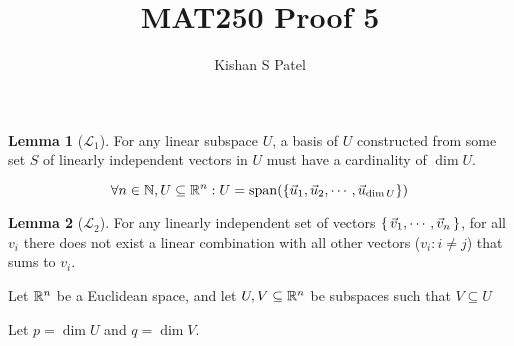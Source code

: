 \documentclass{exam}
\theoremstyle{plain}
\theoremstyle{definition}
\newtheorem{lemma}{Lemma}
\begin{document}
\title{MAT250 Proof 5}
\author{Kishan S Patel}
\maketitle

\renewcommand{\qedsymbol}{QED}

\begin{lemma}[$\mathcal L_1$]
	For any linear subspace $U$, a basis of $U$ constructed from some set $S$ of linearly independent vectors in $U$ must have a cardinality of $\dim U$.

	$$ \forall n\in {\mathbb N},U \subseteq {\mathbb R}^n  : U = {\operatorname{span} }{ \left(  \left\{  \vec u_1, \vec u_2, \cdots, \vec u_{\dim U}  \right\} \right) } $$
\end{lemma}

\begin{lemma}[$\mathcal L_2$]
	For any linearly independent set of vectors $\set{\vec v_1, \cdots, \vec v_n}$, for all $v_i$ there does not exist a linear combination with all other vectors ($v_i : i \neq j$) that sums to $v_i$.
\end{lemma}


Let ${\mathbb R}^n$ be a Euclidean space, and let $U, V\subseteq {\mathbb R}^n$ be subspaces such that $V \subseteq U$

Let $p = \dim U$ and $q=\dim V$.


\begin{questions}
	
	
\end{questions}
\end{document}
